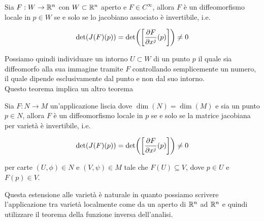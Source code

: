 \begin{theorem}
	Sia $ F : W \to \mathbb{R}^{n} $ con $ W \subset \mathbb{R}^{n} $ aperto e $ F \in C^{\infty} $, allora $ F $ è un diffeomorfismo locale in $ p \in W $ se e solo se lo jacobiano associato è invertibile, i.e.
	
	\begin{equation}
		\det(J(F)(p)) = \det( \left[ \pdv{F}{x^{j}} \hspace{0px} (p) \right] ) \neq 0
	\end{equation}
\end{theorem}

Possiamo quindi individuare un intorno $ U \subset W $ di un punto $ p $ il quale sia diffeomorfo alla sua immagine tramite $ F $ controllando semplicemente un numero, il quale dipende esclusivamente dal punto e non dal suo intorno.\\
Questo teorema implica un altro teorema

\begin{theorem}\label{ift}
	Sia $ F : N \to M $ un'applicazione liscia dove $ \dim(N) = \dim(M) $ e sia un punto $ p \in N $, allora $ F $ è un diffeomorfismo locale in $ p $ se e solo se la matrice jacobiana per varietà è invertibile, i.e.
	
	\begin{equation}
		\det(J(F)(p)) = \det( \left[ \pdv{F}{x^{j}} \hspace{0px} (p) \right] ) \neq 0
	\end{equation}
	
	per carte $ (U,\phi) \in N $ e $ (V,\psi) \in M $ tale che $ F(U) \subseteq V $, dove $ p \in U $ e $ F(p) \in V $.
\end{theorem}

Questa estensione alle varietà è naturale in quanto possiamo scrivere l'applicazione tra varietà localmente come da un aperto di $ \mathbb{R}^{n} $ ad $ \mathbb{R}^{n} $ e quindi utilizzare il teorema della funzione inversa dell'analisi.

